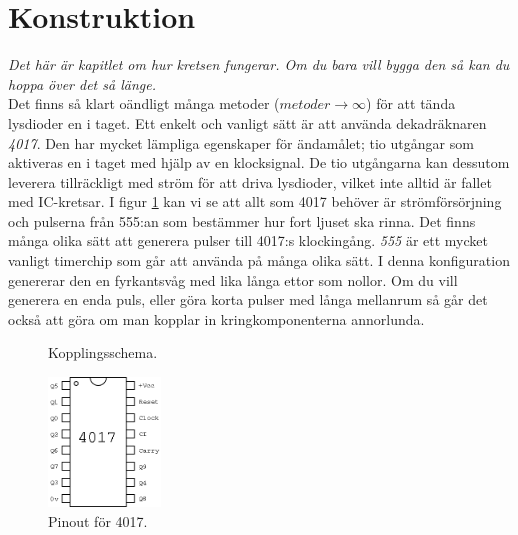 \documentclass{article}
\begin{document}
\section{Konstruktion}
\emph{Det här är kapitlet om hur kretsen fungerar. Om du bara vill bygga den så kan du hoppa över det så länge.}\\

Det finns så klart oändligt många metoder ($metoder\rightarrow \infty$)  för att tända lysdioder en i taget. Ett enkelt och vanligt sätt är att använda dekadräknaren \emph{4017}. Den har mycket lämpliga egenskaper för ändamålet; tio utgångar som aktiveras en i taget med hjälp av en klocksignal. De tio utgångarna kan dessutom leverera tillräckligt med ström för att driva lysdioder, vilket inte alltid är fallet med IC-kretsar. I figur \ref{fig:sch} kan vi se att allt som 4017 behöver är strömförsörjning och pulserna från 555:an som bestämmer hur fort ljuset ska rinna. Det finns många olika sätt att generera pulser till 4017:s klockingång. \emph{555} är ett mycket vanligt timerchip som går att använda på många olika sätt. I denna konfiguration genererar den en fyrkantsvåg med lika långa ettor som nollor. Om du vill generera en enda puls, eller göra korta pulser med långa mellanrum så går det också att göra om man kopplar in kringkomponenterna annorlunda.

\begin{figure}[h]
\centering
{}
\caption{Kopplingsschema.}
\label{fig:sch}
\end{figure}


\begin{figure}
\vspace{-10pt}
\centering
\includegraphics[width=3cm]{fig/4017.png}
\caption{Pinout för 4017.}
\label{fig:4017}
\end{figure}
\end{document}
